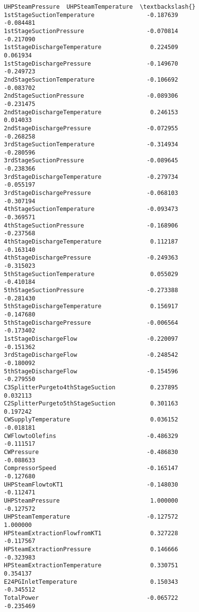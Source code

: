 \documentclass[11pt]{article}
\begin{document}
\begin{tcolorbox}[breakable, size=fbox, boxrule=.5pt, pad at break*=1mm, opacityfill=0]
\begin{Verbatim}[commandchars=\\\{\}]
                                  UHPSteamPressure  UHPSteamTemperature  \textbackslash{}
1stStageSuctionTemperature               -0.187639            -0.084481
1stStageSuctionPressure                  -0.070814            -0.217090
1stStageDischargeTemperature              0.224509             0.061934
1stStageDischargePressure                -0.149670            -0.249723
2ndStageSuctionTemperature               -0.106692            -0.083702
2ndStageSuctionPressure                  -0.089306            -0.231475
2ndStageDischargeTemperature              0.246153             0.014033
2ndStageDischargePressure                -0.072955            -0.268258
3rdStageSuctionTemperature               -0.314934            -0.280596
3rdStageSuctionPressure                  -0.089645            -0.238366
3rdStageDischargeTemperature             -0.279734            -0.055197
3rdStageDischargePressure                -0.068103            -0.307194
4thStageSuctionTemperature               -0.093473            -0.369571
4thStageSuctionPressure                  -0.168906            -0.237568
4thStageDischargeTemperature              0.112187            -0.163140
4thStageDischargePressure                -0.249363            -0.315023
5thStageSuctionTemperature                0.055029            -0.410184
5thStageSuctionPressure                  -0.273388            -0.281430
5thStageDischargeTemperature              0.156917            -0.147680
5thStageDischargePressure                -0.006564            -0.173402
1stStageDischargeFlow                    -0.220097            -0.151362
3rdStageDischargeFlow                    -0.248542            -0.180092
5thStageDischargeFlow                    -0.154596            -0.279550
C3SplitterPurgeto4thStageSuction          0.237895             0.032113
C2SplitterPurgeto5thStageSuction          0.301163             0.197242
CWSupplyTemperature                       0.036152            -0.018181
CWFlowtoOlefins                          -0.486329            -0.111517
CWPressure                               -0.486830            -0.088633
CompressorSpeed                          -0.165147            -0.127680
UHPSteamFlowtoKT1                        -0.148030            -0.112471
UHPSteamPressure                          1.000000            -0.127572
UHPSteamTemperature                      -0.127572             1.000000
HPSteamExtractionFlowfromKT1              0.327228            -0.117567
HPSteamExtractionPressure                 0.146666            -0.323983
HPSteamExtractionTemperature              0.330751             0.354137
E24PGInletTemperature                     0.150343            -0.345512
TotalPower                               -0.065722            -0.235469


\end{Verbatim}
\end{tcolorbox}
\end{document}
